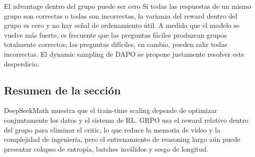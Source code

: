 \begin{warningbox}{El advantage dentro del grupo puede ser cero}
Si todas las respuestas de un mismo grupo son correctas o todas son incorrectas, la varianza del reward dentro del grupo es cero y no hay señal de ordenamiento útil. A medida que el modelo se vuelve más fuerte, es frecuente que las preguntas fáciles produzcan grupos totalmente correctos; las preguntas difíciles, en cambio, pueden salir todas incorrectas. El dynamic sampling de DAPO se propone justamente resolver este desperdicio.
\end{warningbox}

\subsection{Resumen de la sección}

DeepSeekMath muestra que el train-time scaling depende de optimizar conjuntamente los datos y el sistema de RL. GRPO usa el reward relativo dentro del grupo para eliminar el critic, lo que reduce la memoria de video y la complejidad de ingeniería, pero el entrenamiento de reasoning largo aún puede presentar colapso de entropía, batches inválidos y sesgo de longitud.

